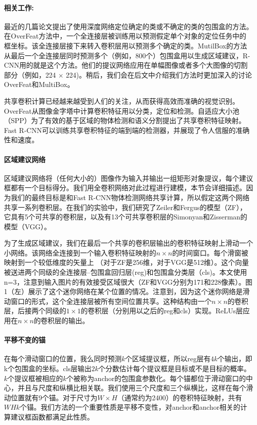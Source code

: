 \documentclass[12pt,a4paper,titlepage]{article}
\begin{document}
\paragraph{相关工作:}
最近的几篇论文提出了使用深度网络定位确定的类或不确定的类的包围盒的方法。在OverFeat方法中，一个全连接层被训练用以预测假定单个对象的定位任务中的框坐标。该全连接层接下来转入卷积层用以预测多个确定的类。MutilBox的方法从最后一个全连接层同时预测多个（例如，800个）包围盒用以生成区域建议，R-CNN用的就是这个方法。他们的提议网络应用在单幅图像或者多个大图像的切割部分（例如，224 $\times$ 224)。稍后，我们会在后文中介绍我们方法时更加深入的讨论OverFeat和MultiBox。\par

共享卷积计算已经越来越受到人们的关注，从而获得高效而准确的视觉识别。OverFeat从图像金字塔中计算卷积特征用以分类，定位和检测。自适应大小池（SPP）为了有效的基于区域的物体检测和语义分割提出了共享卷积特征映射。Fast R-CNN可以训练共享卷积特征的端到端的检测器，并展现了令人信服的准确性和速度。

\paragraph{区域建议网络}
区域建议网络将（任何大小的）图像作为输入并输出一组矩形对象提议，每个建议框都有一个目标得分。我们用全卷积网络对此过程进行建模，本节会详细描述。因为我们的最终目标是和Fast R-CNN物体检测网络共享计算，所以假定这两个网络共享一系列卷积层。在我们的实验中，我们研究了Zeiler和Fergus的模型（ZF），它具有5个可共享的卷积层，以及有13个可共享卷积层的Simonyan和Zisserman的模型（VGG）。\par

为了生成区域建议，我们在最后一个共享的卷积层输出的卷积特征映射上滑动一个小网络。该网络全连接到一个输入卷积特征映射的$n \times n$的时间窗口。每个滑窗被映射到一个较低维度的矢量上 （对于ZF是256维，对于VGG是512维）。这个向量被送进两个同级的全连接层--包围盒回归层(reg)和包围盒分类层（cls)。本文使用n=3，注意到输入图片的有效接受区域很大（ZF和VGG分别为171和228像素）。图1（左）展示了这个迷你网络在某个位置的情况。注意到，因为这个迷你网络是滑动窗口的形式，这个全连接层被所有空间位置共享。这种结构由一个$n \times n$的卷积层，后接两个同级的$1 \times 1$的卷积层（分别用以之后的reg和cls）实现。ReLUs层应用在$n \times n$的卷积层的输出。

\paragraph{平移不变的锚}
在每个滑动窗口的位置，我么同时预测$k$个区域提议框，所以reg层有$4k$个输出，即k个包围盒的坐标。cls层输出$2k$个分数估计每个提议框是目标或不是目标的概率。$k$个提议框被相应的$k$个被称为anchor的包围盒参数化。每个锚都位于滑动窗口的中心，并且与尺度和纵横比相关联。我们使用三个尺度和三个纵横比，这样在每个滑动位置就有9个锚。对于尺寸为$W \times H$（通常约为2400）的卷积特征映射，共有$WHk$个锚。我们方法的一个重要性质是平移不变性，对anchor和anchor相关的计算建议框函数都满足此性质。\par
\end{document}
